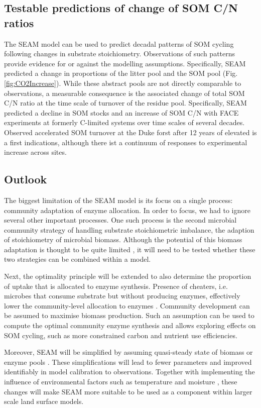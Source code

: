 \subsection{Testable predictions of change of SOM C/N ratios}
The SEAM model can be used to predict decadal patterns of SOM cycling following
changes in substrate stoichiometry. Observations of such patterns provide evidence
for or against the modelling assumptions.
Specifically, SEAM predicted a change in proportions of the litter pool and the
SOM pool (Fig. \ref{fig:CO2Increase}). While these abstract pools are not
directly comparable to observations, a measurable consequence is the associated
change of total SOM C/N ratio at the time scale of turnover of the residue
pool. Specifically, SEAM predicted a decline in SOM stocks and an increase of
SOM C/N with FACE experiments at formerly C-limited systems over time scales of
several decades. Observed accelerated SOM turnover at the Duke forst after 12
years of elevated  \citep{Drake11} is a first indications, although
there ist a continuum of responses to experimental  increase across sites.
 
\subsection{Outlook} 
The biggest limitation of the SEAM model is its focus on a single process:
community adaptation of enzyme allocation. In order to focus, we had to ignore
several other important processes. One such process is the second microbial
community strategy of handling substrate stoichiometric imbalance, the adaption
of stoichiometry of microbial biomass. Although the potential of this biomass
adaptation is thought to be quite limited \citep{Mooshammer14}, it will need to
be tested whether these two strategies can be combined within a model.

Next, the optimality principle will be extended to also determine the proportion
of uptake that is allocated to enzyme synthesis. Presence of cheaters, i.e.
microbes that consume substrate but without producing enzymes, effectively lower
the community-level allocation to enzymes \citep{Kaiser14}. Community
development can be assumed to maximise biomass production. Such an assumption
can be used to compute the optimal community enzyme synthesis and allows
exploring effects on SOM cycling, such as more constrained carbon and nutrient
use efficiencies.

Moreover, SEAM will be simplified by assuming quasi-steady state of biomass or
enzyme pools \citep{Wutzler13}. These simplifications will lead to fewer
parameters and improved identifiably in model calibration to observations.
Together with implementing the influence of environmental factors such as
temperature and moisture \citep{Davidson12}, these changes will make SEAM more
suitable to be used as a component within larger scale land surface models.
 

